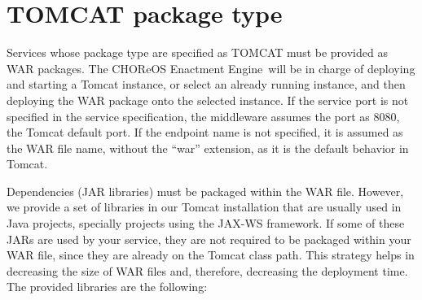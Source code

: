 \documentclass[a4paper, 10pt]{article}
\newcommand{\ee}{CHOReOS Enactment Engine}
\begin{document}
\section{TOMCAT package type}

Services whose package type are specified as TOMCAT must be provided as WAR packages. The \ee\ will be in charge of deploying and starting a Tomcat instance, or select an already running instance, and then deploying the WAR package onto the selected instance. If the service port is not specified in the service specification, the middleware assumes the port as 8080, the Tomcat default port. If the endpoint name is not specified, it is assumed as the WAR file name, without the ``war'' extension, as it is the default behavior in Tomcat.  

Dependencies (JAR libraries) must be packaged within the WAR file. However, we provide a set of libraries in our Tomcat installation that are usually used in Java projects, specially projects using the JAX-WS framework. If some of these JARs are used by your service, they are not required to be packaged within your WAR file, since they are already on the Tomcat class path. This strategy helps in decreasing the size of WAR files and, therefore, decreasing the deployment time. The provided libraries are the following:
\end{document}
